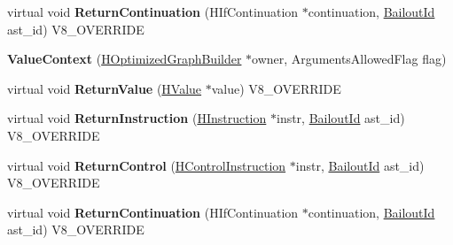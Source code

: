 \begin{DoxyCompactItemize}
\item 
\hypertarget{classv8_1_1internal_1_1_v8___f_i_n_a_l_a3c3742dc48b0f93f5dc4236db07168be}{}virtual void {\bfseries Return\+Continuation} (H\+If\+Continuation $\ast$continuation, \hyperlink{classv8_1_1internal_1_1_bailout_id}{Bailout\+Id} ast\+\_\+id) V8\+\_\+\+O\+V\+E\+R\+R\+I\+D\+E\label{classv8_1_1internal_1_1_v8___f_i_n_a_l_a3c3742dc48b0f93f5dc4236db07168be}

\item 
\hypertarget{classv8_1_1internal_1_1_v8___f_i_n_a_l_a9b7e06af2f9ebbb70d87a3834697a9a4}{}{\bfseries Value\+Context} (\hyperlink{classv8_1_1internal_1_1_h_optimized_graph_builder}{H\+Optimized\+Graph\+Builder} $\ast$owner, Arguments\+Allowed\+Flag flag)\label{classv8_1_1internal_1_1_v8___f_i_n_a_l_a9b7e06af2f9ebbb70d87a3834697a9a4}

\item 
\hypertarget{classv8_1_1internal_1_1_v8___f_i_n_a_l_a786f6c33e41273e0430caf595a86029b}{}virtual void {\bfseries Return\+Value} (\hyperlink{classv8_1_1internal_1_1_h_value}{H\+Value} $\ast$value) V8\+\_\+\+O\+V\+E\+R\+R\+I\+D\+E\label{classv8_1_1internal_1_1_v8___f_i_n_a_l_a786f6c33e41273e0430caf595a86029b}

\item 
\hypertarget{classv8_1_1internal_1_1_v8___f_i_n_a_l_adde278b58415cb2d35bacc91538f0894}{}virtual void {\bfseries Return\+Instruction} (\hyperlink{classv8_1_1internal_1_1_h_instruction}{H\+Instruction} $\ast$instr, \hyperlink{classv8_1_1internal_1_1_bailout_id}{Bailout\+Id} ast\+\_\+id) V8\+\_\+\+O\+V\+E\+R\+R\+I\+D\+E\label{classv8_1_1internal_1_1_v8___f_i_n_a_l_adde278b58415cb2d35bacc91538f0894}

\item 
\hypertarget{classv8_1_1internal_1_1_v8___f_i_n_a_l_a87e4ffd42f8a26a5da6cc93125d6a804}{}virtual void {\bfseries Return\+Control} (\hyperlink{classv8_1_1internal_1_1_h_control_instruction}{H\+Control\+Instruction} $\ast$instr, \hyperlink{classv8_1_1internal_1_1_bailout_id}{Bailout\+Id} ast\+\_\+id) V8\+\_\+\+O\+V\+E\+R\+R\+I\+D\+E\label{classv8_1_1internal_1_1_v8___f_i_n_a_l_a87e4ffd42f8a26a5da6cc93125d6a804}

\item 
\hypertarget{classv8_1_1internal_1_1_v8___f_i_n_a_l_a3c3742dc48b0f93f5dc4236db07168be}{}virtual void {\bfseries Return\+Continuation} (H\+If\+Continuation $\ast$continuation, \hyperlink{classv8_1_1internal_1_1_bailout_id}{Bailout\+Id} ast\+\_\+id) V8\+\_\+\+O\+V\+E\+R\+R\+I\+D\+E\label{classv8_1_1internal_1_1_v8___f_i_n_a_l_a3c3742dc48b0f93f5dc4236db07168be}


\end{DoxyCompactItemize}
